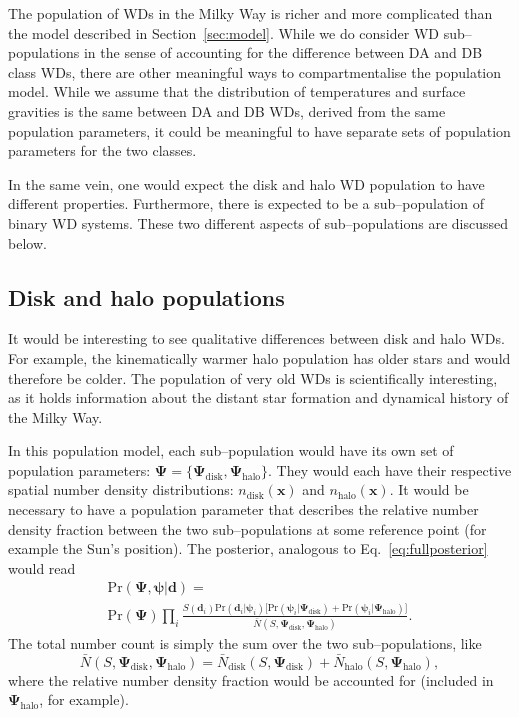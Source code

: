 \documentclass[fleqn,usenatbib]{mnras}
\newcommand{\popp}{\boldsymbol{\Psi}}
\newcommand{\objp}{\boldsymbol{\psi}}
\newcommand{\data}{\mathbf{d}}
\newcommand{\pr}{\text{Pr}}
\begin{document}
The population of WDs in the Milky Way is richer and more complicated than the model described in Section~\ref{sec:model}. While we do consider WD sub--populations in the sense of accounting for the difference between DA and DB class WDs, there are other meaningful ways to compartmentalise the population model. While we assume that the distribution of temperatures and surface gravities is the same between DA and DB WDs, derived from the same population parameters, it could be meaningful to have separate sets of population parameters for the two classes.

In the same vein, one would expect the disk and halo WD population to have different properties. Furthermore, there is expected to be a sub--population of binary WD systems. These two different aspects of sub--populations are discussed below.



\subsection{Disk and halo populations}

It would be interesting to see qualitative differences between disk and halo WDs. For example, the kinematically warmer halo population has older stars and would therefore be colder. The population of very old WDs is scientifically interesting, as it holds information about the distant star formation and dynamical history of the Milky Way.

In this population model, each sub--population would have its own set of population parameters: $\popp = \{ \popp_\text{disk},\popp_\text{halo} \}$. They would each have their respective spatial number density distributions: $n_\text{disk}(\mathbf{x})$ and $n_\text{halo}(\mathbf{x})$. It would be necessary to have a population parameter that describes the relative number density fraction between the two sub--populations at some reference point (for example the Sun's position). The posterior, analogous to Eq.~\eqref{eq:fullposterior} would read
\begin{equation}\label{eq:posterior_disk_halo}
\begin{split}
	\pr(\popp,\objp | \data ) = \\ \pr(\popp)
	\prod_i \frac{S(\data_i) \pr(\data_i | \objp_i) \Big[ \pr(\objp_i | \popp_\text{disk})+\pr(\objp_i | \popp_\text{halo}) \Big]}{\bar{N}(S,\popp_\text{disk},\popp_\text{halo})}.
\end{split}
\end{equation}
The total number count is simply the sum over the two sub--populations, like
\begin{equation}
	\bar{N}(S,\popp_\text{disk},\popp_\text{halo})=\bar{N}_\text{disk}(S,\popp_\text{disk})+\bar{N}_\text{halo}(S,\popp_\text{halo}),
\end{equation}
where the relative number density fraction would be accounted for (included in $\popp_\text{halo}$, for example).
\end{document}
